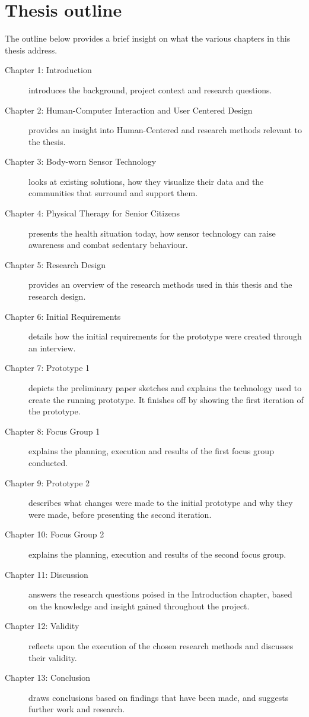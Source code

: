 \section{Thesis outline}
The outline below provides a brief insight on what the various chapters in this thesis address.

\begin{description}
  \item[Chapter 1: Introduction] introduces the background, project context and research questions.
  \item[Chapter 2: Human-Computer Interaction and User Centered Design] provides an insight into Human-Centered and research methods relevant to the thesis.
  \item[Chapter 3: Body-worn Sensor Technology] looks at existing solutions, how they visualize their data and the communities that surround and support them.
  \item[Chapter 4: Physical Therapy for Senior Citizens] presents the health situation today, how sensor technology can raise awareness and combat sedentary behaviour.
  \item[Chapter 5: Research Design] provides an overview of the research methods used in this thesis and the research design.
  \item[Chapter 6: Initial Requirements] details how the initial requirements for the prototype were created through an interview.
  \item[Chapter 7: Prototype 1] depicts the preliminary paper sketches and explains the technology used to create the running prototype. It finishes off by showing the first iteration of the prototype.
  \item[Chapter 8: Focus Group 1] explains the planning, execution and results of the first focus group conducted.
  \item[Chapter 9: Prototype 2] describes what changes were made to the initial prototype and why they were made, before presenting the second iteration.
  \item[Chapter 10: Focus Group 2] explains the planning, execution and results of the second focus group.
  \item[Chapter 11: Discussion] answers the research questions poised in the Introduction chapter, based on the knowledge and insight gained throughout the project.
  \item[Chapter 12: Validity] reflects upon the execution of the chosen research methods and discusses their validity.
  \item[Chapter 13: Conclusion] draws conclusions based on findings that have been made, and suggests further work and research.
\end{description}

